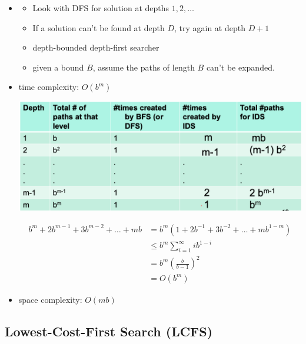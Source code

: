 \documentclass{article}
\begin{document}
\begin{itemize}
    \item
        \begin{itemize}
            \item Look with DFS for solution at depths $1, 2, \ldots$
            \item If a solution can't be found at depth $D$, try again at depth $D+1$
            \item depth-bounded depth-first searcher
            \item given a bound $B$, assume the paths of length $B$ can't be expanded.
        \end{itemize}
    \item time complexity: $O(b^m)$

    \includegraphics[scale=0.3]{ids_time_complexity}
    
    \begin{align*}
        b^m  + 2b^{m-1} + 3b^{m-2} + \ldots + mb 
        &= b^m (1 + 2b^{-1} + 3b^{-2} + \ldots + mb^{1-m}) \\
        & \leq b^m \sum\limits_{i=1}^{\infty} ib^{1-i} \\
        &= b^m (\frac{b}{b-1})^2 \\
        &= O(b^m)
    \end{align*}
    \item space complexity: $O(mb)$
\end{itemize}

\subsection{Lowest-Cost-First Search (LCFS)}
\end{document}
